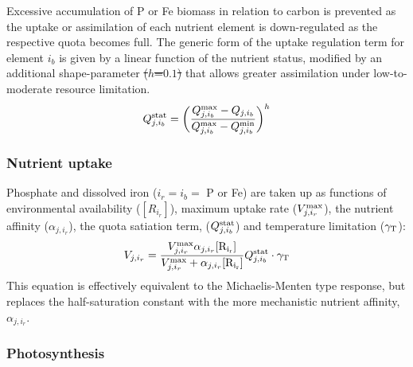\documentclass[gmd, manuscript]{copernicus}
\providecommand{\DIFadd}[1]{{\protect\color{blue}\uwave{#1}}} %
\providecommand{\DIFdel}[1]{{\protect\color{red}\sout{#1}}}                      %
\providecommand{\DIFaddbegin}{} %
\providecommand{\DIFaddend}{} %
\providecommand{\DIFdelbegin}{} %
\providecommand{\DIFdelend}{} %
\begin{document}
Excessive accumulation of P or Fe biomass in relation to carbon is prevented as the uptake or assimilation of each nutrient element is down-regulated as the respective quota becomes full. The generic form of the uptake regulation term for element $i_b$ is given by a linear function of the nutrient status, modified by an additional shape-parameter  \DIFdelbegin \DIFdel{($h$=$0.1$) }\DIFdelend \DIFaddbegin \DIFadd{\mbox{%
\cite[$h$=$0.1$;][]{Geider:1998} }\hspace{0pt}%
}\DIFaddend that allows greater assimilation under low-to-moderate resource limitation.
%
\begin{equation}
\label{QstatN}
Q_{j,i_b}^{\rm stat} = \bigg(\frac{Q^{\rm max}_{j,i_b}-Q_{j,i_b}}{Q_{j,i_b}^{\rm max}-Q_{j,i_b}^{\rm min}}\bigg)^h
\end{equation}
%

\subsubsection{Nutrient uptake}

Phosphate and dissolved iron ($i_r=i_b=$ P or Fe) are taken up as functions of environmental availability ($[R_{i_r}]$), maximum uptake rate ($V_{j,i_r}^{\rm max}$), the nutrient affinity ($\alpha_{j,i_r}$), the quota satiation term, ($Q^{\rm stat}_{j,i_b}$) and temperature limitation ($\gamma_{\rm T}$):
%
\begin{equation}
V_{j,i_r} = \frac{V_{j,i_r}^{\rm max} \alpha_{j,i_r} {\rm [R_{i_r}]}}{V_{j,i_r}^{\rm max} + \alpha_{j,i_r}{\rm [R_{i_r}]}} Q^{\rm stat}_{j,i_b} \cdot \gamma_{\rm T}
\end{equation}
%
This equation is effectively equivalent to the Michaelis-Menten type response, but replaces the half-saturation constant with the more mechanistic nutrient affinity, $\alpha_{j,i_r}$.

\subsubsection{Photosynthesis}
\end{document}
